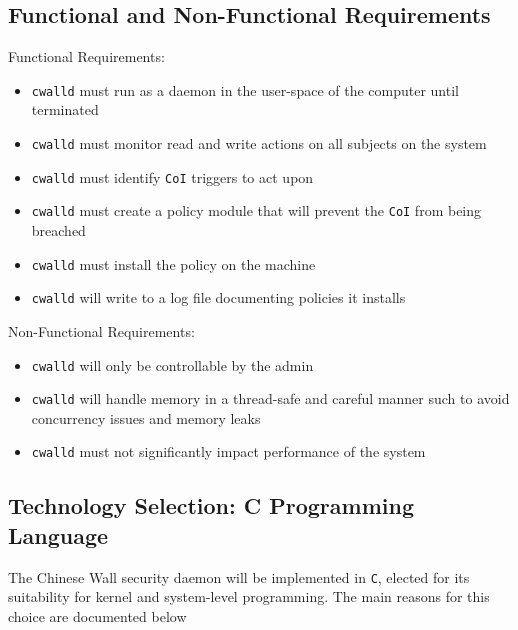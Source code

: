 \documentclass[11pt,titlepage,dvipsnames,table,xcdraw]{article}
\begin{document}
\subsection{Functional and Non-Functional Requirements}
Functional Requirements: 
\begin{itemize}
  \item \verb_cwalld_ must run as a daemon in the user-space of the computer until terminated
  \item \verb_cwalld_ must monitor read and write actions on all subjects on the system
  \item \verb_cwalld_ must identify \verb_CoI_ triggers to act upon
  \item \verb_cwalld_ must create a policy module that will prevent the \verb_CoI_ from being breached
  \item \verb_cwalld_ must install the policy on the machine
  \item \verb_cwalld_ will write to a log file documenting policies it installs
\end{itemize}

Non-Functional Requirements:
\begin{itemize}
  \item \verb_cwalld_ will only be controllable by the admin
  \item \verb_cwalld_ will handle memory in a thread-safe and careful manner such to avoid concurrency issues and memory leaks
  \item \verb_cwalld_ must not significantly impact performance of the system
\end{itemize}

\subsection{Technology Selection: C Programming Language}

The Chinese Wall security daemon will be implemented in \verb_C_, elected for its suitability for kernel and system-level programming. The main reasons for this choice are documented below
\end{document}
